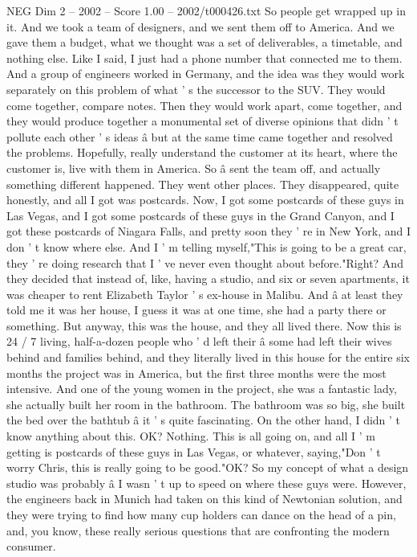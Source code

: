 \begin{textsample}{NEG Dim 2 – 2002 – Score 1.00 – 2002/t000426.txt}
So people get wrapped up in it.
And we took a team of designers, and we sent them off to America.
And we gave them a budget, what we thought was a set of deliverables, a timetable, and nothing else.
Like I said, I just had a phone number that connected me to them.
And a group of engineers worked in Germany, and the idea was they would work separately on this problem of what ' s the successor to the SUV.
They would come together, compare notes.
Then they would work apart, come together, and they would produce together a monumental set of diverse opinions that didn ' t pollute each other ' s ideas â but at the same time came together and resolved the problems.
Hopefully, really understand the customer at its heart, where the customer is, live with them in America.
So â sent the team off, and actually something different happened.
They went other places.
They disappeared, quite honestly, and all I got was postcards.
Now, I got some postcards of these guys in Las Vegas, and I got some postcards of these guys in the Grand Canyon, and I got these postcards of Niagara Falls, and pretty soon they ' re in New York, and I don ' t know where else.
And I ' m telling myself,"This is going to be a great car, they ' re doing research that I ' ve never even thought about before."Right?
And they decided that instead of, like, having a studio, and six or seven apartments, it was cheaper to rent Elizabeth Taylor ' s ex-house in Malibu.
And â at least they told me it was her house, I guess it was at one time, she had a party there or something.
But anyway, this was the house, and they all lived there.
Now this is 24 / 7 living, half-a-dozen people who ' d left their â some had left their wives behind and families behind, and they literally lived in this house for the entire six months the project was in America, but the first three months were the most intensive.
And one of the young women in the project, she was a fantastic lady, she actually built her room in the bathroom.
The bathroom was so big, she built the bed over the bathtub â it ' s quite fascinating.
On the other hand, I didn ' t know anything about this.
OK?
Nothing.
This is all going on, and all I ' m getting is postcards of these guys in Las Vegas, or whatever, saying,"Don ' t worry Chris, this is really going to be good."OK?
So my concept of what a design studio was probably â I wasn ' t up to speed on where these guys were.
However, the engineers back in Munich had taken on this kind of Newtonian solution, and they were trying to find how many cup holders can dance on the head of a pin, and, you know, these really serious questions that are confronting the modern consumer.

\end{textsample}
